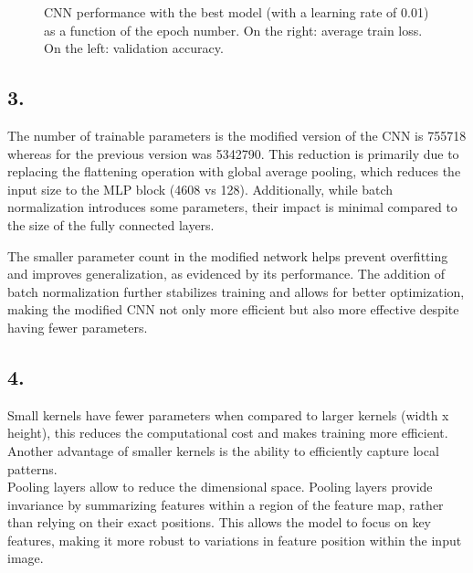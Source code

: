 \documentclass[a4paper, 12pt]{article}
\begin{document}
\begin{figure}[H]
\begin{subfigure}{0.45\linewidth}
        \label{fig:batch_acc_0.01}
    \end{subfigure}
    \vspace{-0.4cm}
    \caption{CNN performance with the best model (with a learning rate of 0.01) as a function of the epoch number. On the right: average train loss. On the left: validation accuracy. }
\end{figure}
\subsection*{3.}
The number of trainable parameters is the modified version of the CNN is 755718 whereas for the previous version was 5342790. This reduction is primarily due to replacing the flattening operation with global average pooling, which reduces the input size to the MLP block (4608 vs 128). Additionally, while batch normalization introduces some parameters, their impact is minimal compared to the size of the fully connected layers.

The smaller parameter count in the modified network helps prevent overfitting and improves generalization, as evidenced by its performance. The addition of batch normalization further stabilizes training and allows for better optimization, making the modified CNN not only more efficient but also more effective despite having fewer parameters.
\subsection*{4.} 

Small kernels have fewer parameters when compared to larger kernels (width x height), this reduces the computational cost and makes training more efficient. Another advantage of smaller kernels is the ability to efficiently capture local patterns.\vspace{0.3cm} \\ 
Pooling layers allow to reduce the dimensional space. Pooling layers provide invariance by summarizing features within a region of the feature map, rather than relying on their exact positions. This allows the model to focus on key features, making it more robust to variations in feature position within the input image.
\end{document}
